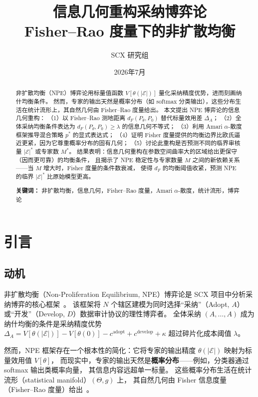 \documentclass[12pt,a4paper]{article}
\title{\textbf{信息几何重构采纳博弈论}\\
\large Fisher--Rao 度量下的非扩散均衡}
\author{SCX 研究组}
\date{2026年7月}
\theoremstyle{definition}
\theoremstyle{remark}
\newcommand{\Fisher}{g}
\begin{document}
\maketitle

\begin{abstract}
非扩散均衡（NPE）博弈论用标量值函数 $V[\theta(|\mathcal{E}|)]$ 量化采纳精度优势，进而刻画纳什均衡条件。
然而，专家的输出天然是概率分布（如 softmax 分类输出），这些分布生活在统计流形上，其自然几何由 Fisher--Rao 度量给出。
本文提出 NPE 博弈论的信息几何重构：
（1）以 Fisher--Rao 测地距离 $d_F(P_\theta, P_0)$ 替代标量效用差 $\Delta_A$；
（2）全体采纳均衡条件表达为 $d_F(P_\theta, P_0) \geq \lambda$ 的信息几何不等式；
（3）利用 Amari $\alpha$-散度框架推导混合策略 $p^*$ 的显式表达式；
（4）证明 Fisher 度量提供的均衡边界比欧氏逼近更紧，因为它尊重概率分布的固有几何；
（5）讨论此重构是否预测不同的临界审核量 $|\mathcal{E}|^*$ 或专家数 $M^*$。
结果表明：信息几何重构在参数空间曲率大的区域给出更保守（因而更可靠）的均衡条件，
且揭示了 NPE 稳定性与专家数量 $M$ 之间的新依赖关系——当 $M$ 增大时，Fisher 度量的条件数衰减，
使得 $d_F$ 的均衡阈值收紧，预测 NPE 的临界 $|\mathcal{E}|^*$ 比原始模型更高。

\textbf{关键词：} 非扩散均衡，信息几何，Fisher--Rao 度量，Amari $\alpha$-散度，统计流形，博弈论
\end{abstract}

\newpage
\tableofcontents
\newpage

\section{引言}

\subsection{动机}

非扩散均衡（Non-Proliferation Equilibrium, NPE）博弈论是 SCX 项目中分析采纳博弈的核心框架~\cite{scx_yajie}。
该框架将 $N$ 个辖区建模为同时选择“采纳”（Adopt, $A$）或“开发”（Develop, $D$）数据审计协议的理性博弈者。
全体采纳 $(A,\dots,A)$ 成为纳什均衡的条件是采纳精度优势 $\Delta_A = V[\theta(|\mathcal{E}|)] - V[\theta(0)] - c^{\text{adopt}} + c^{\text{develop}} + \kappa$
超过碎片化成本阈值 $\lambda$。

然而，NPE 框架存在一个根本性的简化：它将专家的输出精度 $\theta(|\mathcal{E}|)$ 映射为标量效用值 $V[\theta]$，
而现实中，专家的输出天然是\textbf{概率分布}——例如，分类器通过 softmax 输出类概率向量，
其信息内容远超单一标量。
这些概率分布生活在统计流形（statistical manifold）$(\Theta, \Fisher)$ 上，
其自然几何由 Fisher 信息度量（Fisher--Rao 度量）给出~\cite{amari2016information,amari2007methods}。
\end{document}
